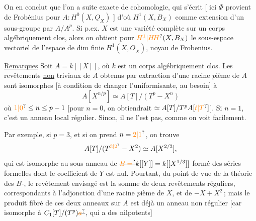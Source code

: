 On en conclut que l'on a   suite exacte de cohomologie, qui s'écrit
[ ici $\Phi$ provient de Frobénius    pour $A\colon H^0(X,\underline O_X)$ ] d'où $H^1(X,B_X)$ comme extension d'un  sous-groupe   par $A/A^p$. Si p.ex.
$X$ est une variété complète sur un corps algébriquement clos, alors on obtient pour
$\unsure{H^1|H\!H}(X,B_X)$ le sous-espace vectoriel de l'espace de dim finie $H^1(X,\underline O_X)$,  noyau de Frobenius.

\uline{Remarques} Soit $A=k[[X]]$, où $k$ est un corps algébriquement clos. Les revêtements \uline{non} triviaux   de $A$ obtenus par extraction d'une racine $p$ième de $A$ sont  isomorphes
[à condition de changer l'uniformisante, au besoin] à
\[
A[X^{n/p}]\simeq A[T]/(T^p-X^n)
\]
où $\unsure{1|0}\leq n\leq p-1$  [pour $n=0$, on obtiendrait $\simeq A[T]/T^pA[\unsure{t|T}]$]. Si $n=1$, c'est un anneau local régulier. Sinon, il ne l'est pas, comme on voit facilement.

Par exemple, si $p=3$,  et si on prend $n=\unsure{2|1}$, on trouve
\[
A[T]/(T^{\unsure{3|2}}-X^2)\simeq A[X^{2/3}],
\]
qui est isomorphe au sous-anneau de $\deleted{\unsure{B=}}k[[Y]]=k[[X^{1/3}]]$ formé des séries formelles dont le coefficient de $Y$ est nul. Pourtant, du point de vue de la théorie des $B$-,
le revêtement envisagé est la somme de deux revêtements réguliers, correspondants  à l'adjonction d'une racine $p$ième de $X$, et de $-X+X^2$\,;
mais le produit fibré de ces deux anneaux  sur $A$ est déjà un anneau non régulier [car isomorphe à $C_1[T]/(T^p)\deleted{\unsure{a}}$, qui a des  nilpotents]
